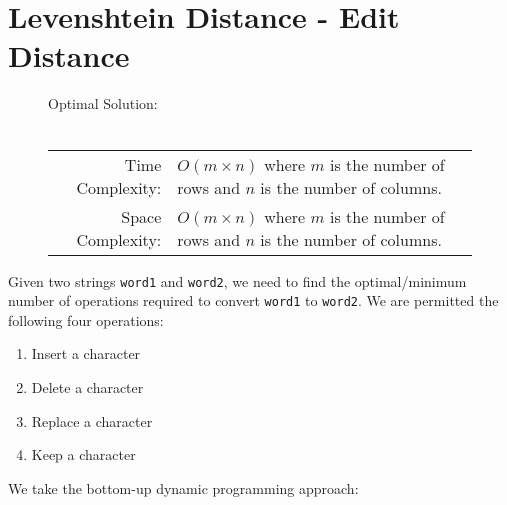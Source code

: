 
\section{Levenshtein Distance - Edit Distance}

\begin{figure}[H]
    Optimal Solution:\\\\
    \begin{tabular}{rl}
        Time Complexity:& \(O(m \times n)\) where \(m\) is the number of rows
        and \(n\) is the number of columns.\\
        Space Complexity:& \(O(m \times n)\) where \(m\) is the number of rows
        and \(n\) is the number of columns.
    \end{tabular}
\end{figure}

Given two strings \texttt{word1} and \texttt{word2}, we
need to find the optimal/minimum number of operations required to convert
\texttt{word1} to \texttt{word2}. We are permitted the
following four operations:

\begin{enumerate}
    \item Insert a character
    \item Delete a character
    \item Replace a character
    \item Keep a character
\end{enumerate}

We take the bottom-up dynamic programming approach:

